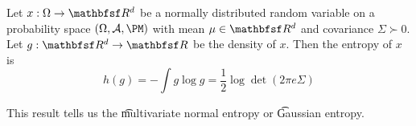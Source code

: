


\begin{proposition}
Let $x: \Omega \to \R^d$ be a normally distributed random variable on a probability space $(\Omega, \CA, \PM)$ with mean $\mu \in \R^d$ and covariance $\Sigma \succ 0$. Let $g: \R^d \to \R$ be the density of $x$. Then the entropy of $x$ is
\[
  h(g) = -\int g \log g = \frac{1}{2} \log \det(2\pi e \Sigma)
\]
\end{proposition}

This result tells us the \t{multivariate normal entropy} or \t{Gaussian entropy}.


\blankpage
